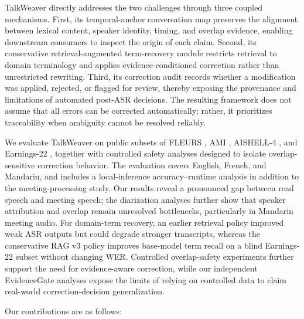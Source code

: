 \documentclass[10pt,twocolumn]{article}
\begin{document}
TalkWeaver directly addresses the two challenges through three coupled mechanisms. First, its temporal-anchor conversation map preserves the alignment between lexical content, speaker identity, timing, and overlap evidence, enabling downstream consumers to inspect the origin of each claim. Second, its conservative retrieval-augmented term-recovery module restricts retrieval to domain terminology and applies evidence-conditioned correction rather than unrestricted rewriting. Third, its correction audit records whether a modification was applied, rejected, or flagged for review, thereby exposing the provenance and limitations of automated post-ASR decisions. The resulting framework does not assume that all errors can be corrected automatically; rather, it prioritizes traceability when ambiguity cannot be resolved reliably.

We evaluate TalkWeaver on public subsets of FLEURS \cite{conneau2022fleurs}, AMI \cite{carletta2005ami}, AISHELL-4 \cite{fu2021aishell4}, and Earnings-22 \cite{delrio2022earnings22}, together with controlled safety analyses designed to isolate overlap-sensitive correction behavior. The evaluation covers English, French, and Mandarin, and includes a local-inference accuracy--runtime analysis in addition to the meeting-processing study. Our results reveal a pronounced gap between read speech and meeting speech; the diarization analyses further show that speaker attribution and overlap remain unresolved bottlenecks, particularly in Mandarin meeting audio. For domain-term recovery, an earlier retrieval policy improved weak ASR outputs but could degrade stronger transcripts, whereas the conservative RAG v3 policy improves base-model term recall on a blind Earnings-22 subset without changing WER. Controlled overlap-safety experiments further support the need for evidence-aware correction, while our independent EvidenceGate analyses expose the limits of relying on controlled data to claim real-world correction-decision generalization.

Our contributions are as follows:
\end{document}
